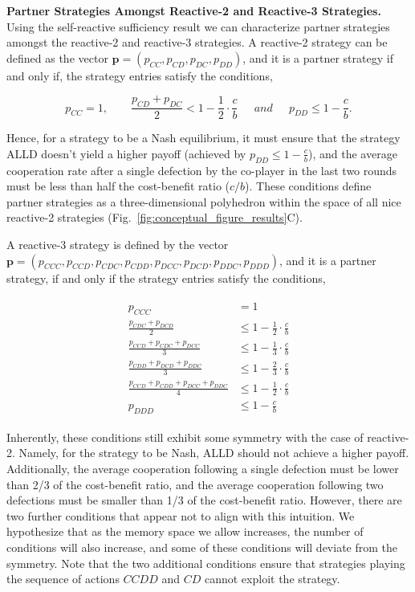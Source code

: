 \documentclass{article}
\theoremstyle{definition}
\begin{document}
\textbf{Partner Strategies Amongst Reactive-2 and Reactive-3 Strategies.}
Using the self-reactive sufficiency result we can characterize partner
strategies amongst the reactive-2 and reactive-3 strategies. A reactive-2
strategy can be defined as the vector $\mathbf{p} = (p_{CC}, p_{CD}, p_{DC},
p_{DD})$, and it is a partner strategy if and only if, the strategy entries
satisfy the conditions,

\begin{equation}\label{eq:two_bit_conditions}
  p_{CC} = 1, \qquad \displaystyle \frac{p_{CD} + p_{DC}}{2} < 1 - \frac{1}{2} \cdot \frac{c}{b} \quad ~~and~~ \quad \displaystyle p_{DD} \leq 1\!-\! \frac{c}{b}.
\end{equation}

Hence, for a strategy to be a Nash equilibrium, it must ensure that the strategy
ALLD doesn't yield a higher payoff (achieved by $p_{DD} \leq 1 - \frac{c}{b}$),
and the average cooperation rate after a single defection by the co-player in
the last two rounds must be less than half the cost-benefit ratio ($c/b$). These
conditions define partner strategies as a three-dimensional polyhedron within
the space of all nice reactive-2 strategies
(Fig.~\ref{fig:conceptual_figure_results}C).

A reactive-3 strategy is defined by the vector $\mathbf{p} = (p_{CCC}, p_{CCD},
p_{CDC}, p_{CDD}, p_{DCC}, p_{DCD}, p_{DDC}, p_{DDD})$, and it is a partner strategy,
if and only if the strategy entries satisfy the conditions,

\begin{align}\label{eq:three_bit_conditions}
  \begin{split}
  p_{CCC} & = 1 \\
  \frac{p_{CDC} + p_{DCD}}{2} & \leq 1 - \frac{1}{2} \cdot \frac{c}{b} \\
  \frac{p_{CCD} + p_{CDC} + p_{DCC}}{3} & \leq 1 - \frac{1}{3} \cdot \frac{c}{b} \\
  \frac{p_{CDD} + p_{DCD} + p_{DDC}}{3} & \leq 1 - \frac{2}{3} \cdot \frac{c}{b} \\
  \frac{p_{CCD} + p_{CDD} + p_{DCC} + p_{DDC}}{4}  & \leq 1 - \frac{1}{2} \cdot \frac{c}{b}  \\
  p_{DDD} & \leq 1\!-\! \frac{c}{b}
  \end{split}
\end{align}

Inherently, these conditions still exhibit some symmetry with the case of
reactive-2. Namely, for the strategy to be Nash, ALLD should not achieve a
higher payoff. Additionally, the average cooperation following a single
defection must be lower than 2/3 of the cost-benefit ratio, and the average
cooperation following two defections must be smaller than 1/3 of the
cost-benefit ratio. However, there are two further conditions that appear not to
align with this intuition. We hypothesize that as the memory space we allow
increases, the number of conditions will also increase, and some of these
conditions will deviate from the symmetry. Note that the two additional conditions ensure
that strategies playing the sequence of actions $CCDD$ and $CD$ cannot exploit the
strategy.
\end{document}
